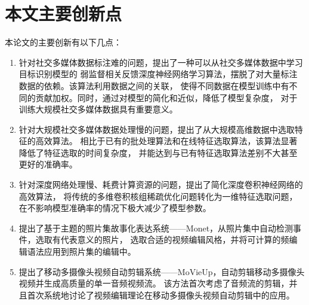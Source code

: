\documentclass[doctor]{ustcthesis}
\begin{document}
\section{本文主要创新点}
本论文的主要创新有以下几点：
\begin{enumerate}
    \item 针对社交多媒体数据标注难的问题，提出了一种可以从社交多媒体数据中学习目标识别模型的
        弱监督相关反馈深度神经网络学习算法，摆脱了对大量标注数据的依赖。该算法利用数据之间的关联，
        使得不同数据在模型训练中有不同的贡献加权。同时，通过对模型的简化和近似，降低了模型复杂度，
        对于训练大规模社交多媒体数据具有重要意义。
    \item 针对大规模社交多媒体数据处理慢的问题，提出了从大规模高维数据中选取特征的高效算法。
        相比于已有的批处理算法和在线特征选取算法，该算法显著降低了特征选取的时间复杂度，
        并能达到与已有特征选取算法差别不大甚至更好的准确率。
    \item 针对深度网络处理慢、耗费计算资源的问题，提出了简化深度卷积神经网络的高效算法，
        将传统的多维卷积核组稀疏优化问题转化为一维特征选取问题，在不影响模型准确率的情况下极大减少了模型参数。
    \item 提出了基于主题的照片集故事化表达系统——Monet，从照片集中自动检测事件，选取有代表意义的照片，
        选取合适的视频编辑风格，并将可计算的频编辑语法应用到照片集的编辑中。
    \item 提出了移动多摄像头视频自动剪辑系统——MoVieUp，自动剪辑移动多摄像头视频并生成高质量的单一音频视频流。
        该方法首次考虑了音频流的剪辑，并且首次系统地讨论了视频编辑理论在移动多摄像头视频自动剪辑中的应用。
\end{enumerate}
\end{document}
